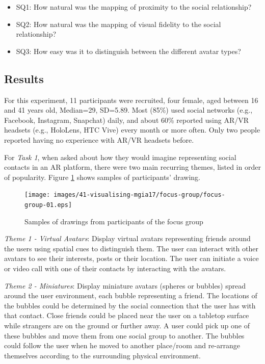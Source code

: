 \begin{itemize}
    \item SQ1: How natural was the mapping of proximity to the social relationship?
    \item SQ2: How natural was the mapping of visual fidelity to the social relationship?
    \item SQ3: How easy was it to distinguish between the different avatar types?
\end{itemize}

\subsection{Results}

For this experiment, 11 participants were recruited, four female, aged between 16 and 41 years old, Median=29, SD=5.89. Most (85\%) used social networks (e.g., Facebook, Instagram, Snapchat) daily, and about 60\% reported using AR/VR headsets (e.g., HoloLens, HTC Vive) every month or more often. Only two people reported having no experience with AR/VR headsets before.

For \textit{Task 1}, when asked about how they would imagine representing social contacts in an AR platform, there were two main recurring themes, listed in order of popularity. Figure \ref{fig:contacts:focus-group} shows samples of participants' drawing.

\begin{figure}[ht]
    \centering
    \texttt{[image: images/41-visualising-mgia17/focus-group/focus-group-01.eps]}
    \caption{Samples of drawings from participants of the focus group}
    \label{fig:contacts:focus-group}
\end{figure}

\textit{Theme 1 - Virtual Avatars}: Display virtual avatars representing friends around the users using spatial cues to distinguish them. The user can interact with other avatars to see their interests, posts or their location. The user can initiate a voice or video call with one of their contacts by interacting with the avatars.


\textit{Theme 2 - Miniatures}: Display miniature avatars (spheres or bubbles) spread around the user environment, each bubble representing a friend. The locations of the bubbles could be determined by the social connection that the user has with that contact. Close friends could be placed near the user on a tabletop surface while strangers are on the ground or further away. A user could pick up one of these bubbles and move them from one social group to another. The bubbles could follow the user when he moved to another place/room and re-arrange themselves according to the surrounding physical environment.

